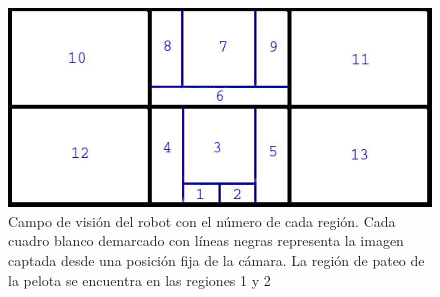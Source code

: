 



 





\begin{figure}[hbtp]

\centering
\includegraphics[scale=0.5]{imagenes/Regiones.jpg}
\caption{Campo de visión del robot con el número de cada región. Cada cuadro blanco demarcado con líneas negras representa la imagen captada desde una posición fija de la cámara. La región de pateo de la pelota se encuentra en las regiones 1 y 2 }
\label{divisionCam}
\end{figure}

